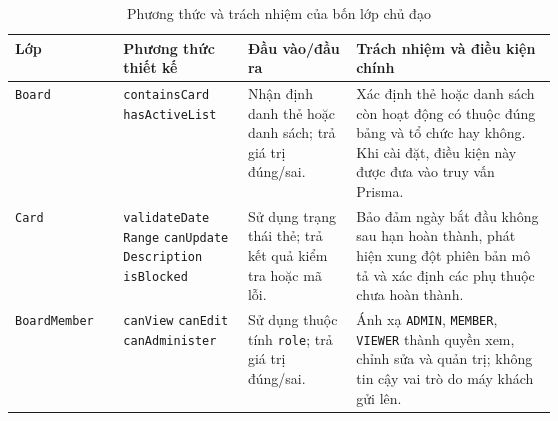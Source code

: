 \documentclass[../DoAn.tex]{subfiles}
\begin{document}
\begin{table}[H]
    \centering
    \caption{Phương thức và trách nhiệm của bốn lớp chủ đạo}
    \label{table:chapter4_class_methods}
    \footnotesize
    \setlength{\tabcolsep}{3pt}
    \renewcommand{\arraystretch}{1.15}
    \begin{tabularx}{\linewidth}{|>{\raggedright\arraybackslash}p{0.20\linewidth}|>{\raggedright\arraybackslash}p{0.23\linewidth}|>{\raggedright\arraybackslash}p{0.20\linewidth}|X|}
        \hline
        \textbf{Lớp} & \textbf{Phương thức thiết kế} & \textbf{Đầu vào/đầu ra} & \textbf{Trách nhiệm và điều kiện chính} \\ \hline
        \texttt{Board}
        &
        \texttt{containsCard}\newline
        \texttt{hasActiveList}
        &
        Nhận định danh thẻ hoặc danh sách; trả giá trị đúng/sai.
        &
        Xác định thẻ hoặc danh sách còn hoạt động có thuộc đúng bảng và tổ chức hay không. Khi cài đặt, điều kiện này được đưa vào truy vấn Prisma. \\ \hline

        \texttt{Card}
        &
        \texttt{validateDate}\newline
        \texttt{Range}\newline
        \texttt{canUpdate}\newline
        \texttt{Description}\newline
        \texttt{isBlocked}
        &
        Sử dụng trạng thái thẻ; trả kết quả kiểm tra hoặc mã lỗi.
        &
        Bảo đảm ngày bắt đầu không sau hạn hoàn thành, phát hiện xung đột phiên bản mô tả và xác định các phụ thuộc chưa hoàn thành. \\ \hline

        \texttt{BoardMember}
        &
        \texttt{canView}\newline
        \texttt{canEdit}\newline
        \texttt{canAdminister}
        &
        Sử dụng thuộc tính \texttt{role}; trả giá trị đúng/sai.
        &
        Ánh xạ \texttt{ADMIN}, \texttt{MEMBER}, \texttt{VIEWER} thành quyền xem, chỉnh sửa và quản trị; không tin cậy vai trò do máy khách gửi lên. \\ \hline


\end{tabularx}
\end{table}
\end{document}
